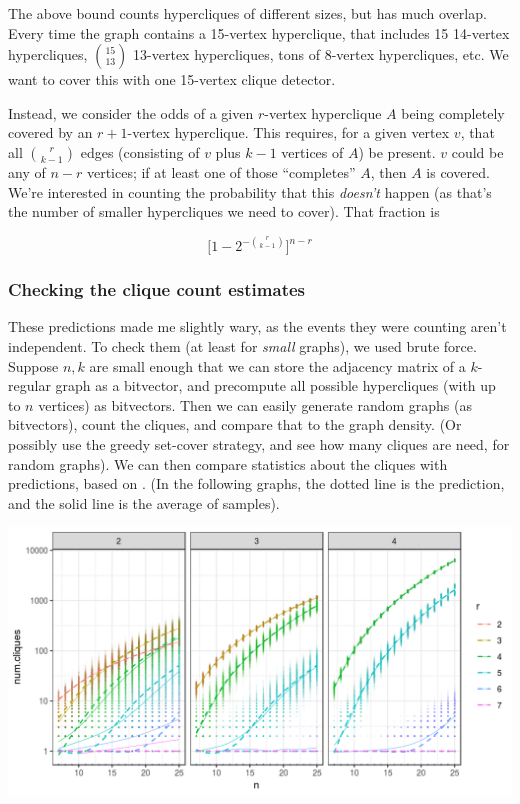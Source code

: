 \documentclass[12pt]{article}
\theoremstyle{definition}
\begin{document}
The above bound counts hypercliques of different sizes, but has much overlap.
Every time the graph contains a 15-vertex hyperclique, that includes
15 14-vertex hypercliques, ${15 \choose 13}$ 13-vertex hypercliques,
tons of 8-vertex hypercliques, etc. We want to
cover this with one 15-vertex clique detector.

Instead, we consider the odds of a given $r$-vertex hyperclique $A$
being completely
covered by an $r+1$-vertex hyperclique. This requires, for a given vertex
$v$, that all ${r \choose {k-1}}$ edges (consisting of $v$ plus $k-1$ vertices
of $A$) be present. $v$ could be any of $n - r$ vertices; if at least one
 of those
``completes'' $A$, then $A$ is covered. We're interested in counting the
probability that this {\em doesn't} happen (as that's the number of smaller
hypercliques we need to cover). That fraction is

\[
\Big[1 - 2^{-{r \choose {k-1}}}\Big]^{n - r}
\]


\subsubsection{Checking the clique count estimates}

These predictions made me slightly wary, as the events they were counting
aren't independent.
To check them (at least for {\em small} graphs), we used brute force.
Suppose $n, k$ are small enough that we can 
store the adjacency matrix of a $k$-regular graph as a bitvector, and precompute
all possible hypercliques
(with up to $n$ vertices) as bitvectors. Then we can easily generate
random graphs (as bitvectors), count the cliques, and compare that to the graph
density. (Or possibly use the greedy set-cover strategy, and see how
many cliques are need, for random graphs).
We can then compare statistics about the cliques with predictions,
based on \cite{bollobas1976cliques}.
(In the following graphs, the dotted line is the prediction, and
the solid line is the average of samples).

\includegraphics[width=1\textwidth]{cliqueCounter/R/numCliques.png}
\end{document}
